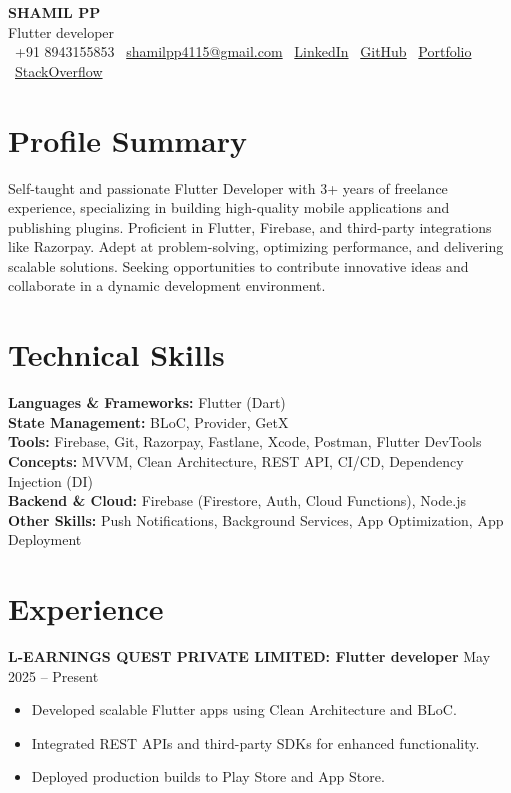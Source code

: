 \documentclass[a4paper,11pt]{article}
\begin{document}
\begin{center}
    {\Huge\bfseries SHAMIL PP} \\[4pt]
    {\large Flutter developer} \\[8pt]
    \faPhone\ +91 8943155853 \quad
    \faEnvelope\ \href{mailto:shamilpp4115@gmail.com}{shamilpp4115@gmail.com} \quad
    \faLinkedin\ \href{https://www.linkedin.com/in/shamil-pp}{LinkedIn} \quad
    \faGithub\ \href{https://github.com/shamilpp}{GitHub} \quad
    \faGlobe\ \href{https://shamil.vercel.app}{Portfolio} \quad
    \faStackOverflow\ \href{https://stackoverflow.com/users/shamil}{StackOverflow}
\end{center}

\section{Profile Summary}
Self-taught and passionate Flutter Developer with 3+ years of freelance experience, specializing in building high-quality mobile applications and publishing plugins. Proficient in Flutter, Firebase, and third-party integrations like Razorpay. Adept at problem-solving, optimizing performance, and delivering scalable solutions. Seeking opportunities to contribute innovative ideas and collaborate in a dynamic development environment.

\section{Technical Skills}
\textbf{Languages \& Frameworks:} Flutter (Dart) \\
\textbf{State Management:} BLoC, Provider, GetX \\
\textbf{Tools:} Firebase, Git, Razorpay, Fastlane, Xcode, Postman, Flutter DevTools \\
\textbf{Concepts:} MVVM, Clean Architecture, REST API, CI/CD, Dependency Injection (DI) \\
\textbf{Backend \& Cloud:} Firebase (Firestore, Auth, Cloud Functions), Node.js \\
\textbf{Other Skills:} Push Notifications, Background Services, App Optimization, App Deployment

\section{Experience}

\textbf{\large L-EARNINGS QUEST PRIVATE LIMITED: Flutter developer} \hfill May 2025 -- Present
\begin{itemize}[leftmargin=1.5em, itemsep=2pt, topsep=4pt]
    \item Developed scalable Flutter apps using Clean Architecture and BLoC.
    \item Integrated REST APIs and third-party SDKs for enhanced functionality.
    \item Deployed production builds to Play Store and App Store.
\end{itemize}
\end{document}
